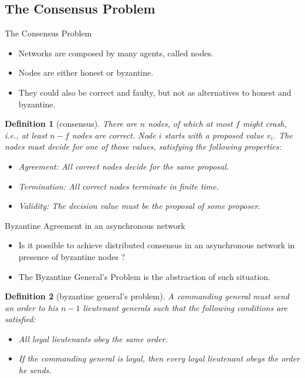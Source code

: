 \documentclass[usenames,dvipsnames]{beamer}
\newtheorem{mydef}{\alert{Definition}}[section]
\begin{document}
    \subsection{The Consensus Problem}  
    \begin{frame}{The Consensus Problem}
        \begin{itemize}
            \item Networks are composed by many agents, called \alert{nodes}.
            \item Nodes are either \alert{honest} or \alert{byzantine}.
            \item They could also be \alert{correct} and \alert{faulty}, but not as alternatives to honest and byzantine.
        \end{itemize}
        \begin{mydef}[consensus]
            There are $n$ nodes, of which at most $f$ might crash, i.e., at least $n-f$ nodes are correct. Node $i$ starts with a proposed value $v_{i}$. The nodes must decide for one of those values, satisfying the following properties:
            \begin{itemize}
                \item Agreement: All correct nodes decide for the same proposal.
                \item Termination: All correct nodes terminate in finite time.
                \item Validity: The decision value must be the proposal of some proposer.
            \end{itemize}
        \end{mydef}
    \end{frame}
        
    \begin{frame}{Byzantine Agreement in an asynchronous network}
           \begin{itemize}
               \item Is it possible to achieve \alert{distributed consensus} in an \alert{asynchronous} network in presence of \alert{byzantine} nodes ?
               \item The \alert{Byzantine General's Problem} is the abstraction of such situation.
           \end{itemize}
           \begin{mydef}[byzantine general's problem]
            A commanding general must send an order to his $n-1$ lieutenant generals such that the following conditions are satisfied:
            \begin{itemize}
                \item All loyal lieutenants obey the same order.
                \item If the commanding general is loyal, then every loyal lieutenant obeys the order he sends.
            \end{itemize}
           \end{mydef}
	        
    \end{frame}
        
\end{document}
